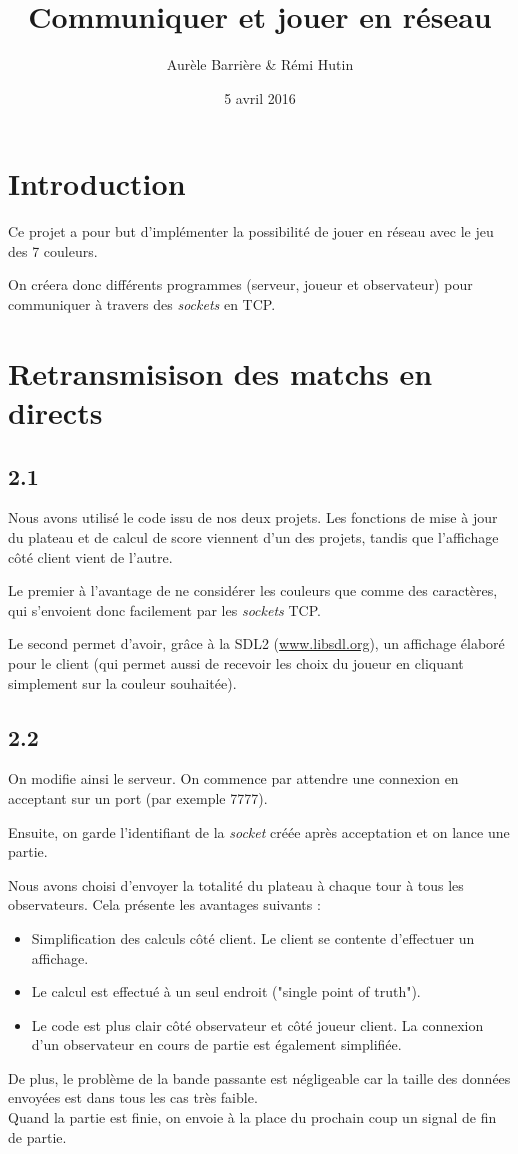\documentclass[12pt]{article}
\title{Communiquer et jouer en réseau}
\author{Aurèle Barrière \& Rémi Hutin}
\date{5 avril 2016}
\def\question#1{\subsection{#1}}
\def\sec#1{\section{#1}}
\begin{document}
\maketitle
\tableofcontents

\sec{Introduction}

Ce projet a pour but d'implémenter la possibilité de jouer en réseau avec le jeu des 7 couleurs.

On créera donc différents programmes (serveur, joueur et observateur) pour communiquer à travers des \textit{sockets} en TCP.


\sec{Retransmisison des matchs en directs}
\question{2.1}
Nous avons utilisé le code issu de nos deux projets. Les fonctions de mise à jour du plateau et de calcul de score viennent d'un des projets, tandis que l'affichage côté client vient de l'autre.

Le premier à l'avantage de ne considérer les couleurs que comme des caractères, qui s'envoient donc facilement par les \textit{sockets} TCP.

Le second permet d'avoir, grâce à la SDL2 (\url{www.libsdl.org}), un affichage élaboré pour le client (qui permet aussi de recevoir les choix du joueur en cliquant simplement sur la couleur souhaitée).


\question{2.2}
On modifie ainsi le serveur. On commence par attendre une connexion en acceptant sur un port (par exemple 7777).

Ensuite, on garde l'identifiant de la \textit{socket} créée après acceptation et on lance une partie.

Nous avons choisi d'envoyer la totalité du plateau à chaque tour à tous les observateurs. Cela présente les avantages suivants :
\begin{itemize}
\item Simplification des calculs côté client. Le client se contente d'effectuer un affichage.
\item Le calcul est effectué à un seul endroit ("single point of truth").
\item Le code est plus clair côté observateur et côté joueur client. La connexion d'un observateur en cours de partie est également simplifiée.
\end{itemize}
De plus, le problème de la bande passante est négligeable car la taille des données envoyées est dans tous les cas très faible. \\

Quand la partie est finie, on envoie à la place du prochain coup un signal de fin de partie.
\end{document}
